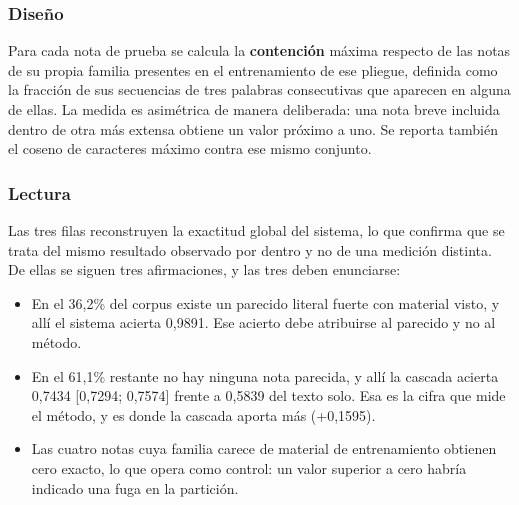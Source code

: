 \subsubsection*{Diseño}

Para cada nota de prueba se calcula la \textbf{contención} máxima respecto de las notas de su propia familia presentes en el entrenamiento de ese pliegue, definida como la fracción de sus secuencias de tres palabras consecutivas que aparecen en alguna de ellas. La medida es asimétrica de manera deliberada: una nota breve incluida dentro de otra más extensa obtiene un valor próximo a uno. Se reporta también el coseno de caracteres máximo contra ese mismo conjunto.

\begin{table}[ht]
\centering
\caption{Acierto según el parecido de la nota con el entrenamiento de su pliegue (149 notas, P2bal, 50 semillas)}
\label{tab:parecido}
\end{table}

\subsubsection*{Lectura}

Las tres filas reconstruyen la exactitud global del sistema, lo que confirma que se trata del mismo resultado observado por dentro y no de una medición distinta. De ellas se siguen tres afirmaciones, y las tres deben enunciarse:

\begin{itemize}
  \item En el 36,2\% del corpus existe un parecido literal fuerte con material visto, y allí el sistema acierta 0,9891. Ese acierto debe atribuirse al parecido y no al método.
  \item En el 61,1\% restante no hay ninguna nota parecida, y allí la cascada acierta 0,7434 [0,7294; 0,7574] frente a 0,5839 del texto solo. Esa es la cifra que mide el método, y es donde la cascada aporta más (+0,1595).
  \item Las cuatro notas cuya familia carece de material de entrenamiento obtienen cero exacto, lo que opera como control: un valor superior a cero habría indicado una fuga en la partición.
\end{itemize}

